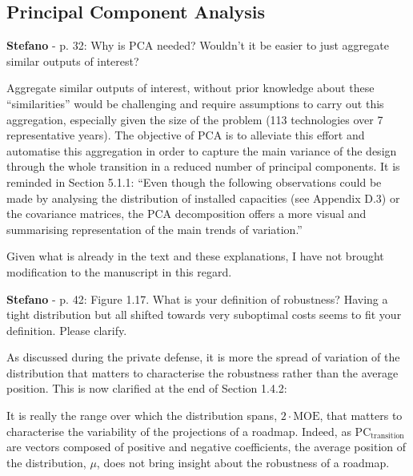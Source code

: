 \documentclass[12pt,a4paper]{article}
\begin{document}
\subsection{Principal Component Analysis}
\label{methodo_PCA}

\begin{mdframed}[style=comment] %
{\color{orange} \textbf{Stefano}} - p. 32: Why is PCA needed? Wouldn’t it be easier to just aggregate similar outputs of interest?
\end{mdframed}

\noindent Aggregate similar outputs of interest, without prior knowledge about these ``similarities'' would be challenging and require assumptions to carry out this aggregation, especially given the size of the problem (113 technologies over 7 representative years). The objective of PCA is to alleviate this effort and automatise this aggregation in order to capture the main variance of the design through the whole transition in a reduced number of principal components. It is reminded in Section 5.1.1: ``Even though the following observations could be made by analysing the distribution of installed capacities (see Appendix D.3) or the covariance matrices, the PCA decomposition offers a more visual and summarising representation of the main trends of variation.''

Given what is already in the text and these explanations, I have not brought modification to the manuscript in this regard.

\begin{mdframed}[style=comment] %
{\color{orange} \textbf{Stefano}} - p. 42: Figure 1.17. What is your definition of robustness? Having a tight distribution but all shifted towards very suboptimal costs seems to fit your definition. Please clarify.
\end{mdframed}

\noindent As discussed during the private defense, it is more the spread of variation of the distribution that matters to characterise the robustness rather than the average position. This is now clarified {\color{blue}at the end of Section 1.4.2}:

\begin{mdframed}[style=manuscript] %
It is really the range over which the distribution spans, $2\cdot \mathrm{MOE}$, that matters to characterise the variability of the projections of a roadmap. Indeed, as $\text{PC}_{\text{transition}}$ are vectors composed of positive and negative coefficients, the average position of the distribution, $\mu$, does not bring insight about the robustness of a roadmap.
\end{mdframed}
\end{document}
